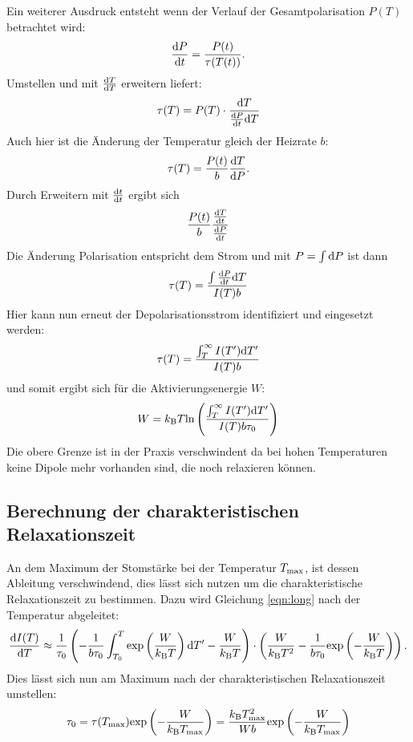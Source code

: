 				Ein weiterer Ausdruck entsteht wenn der Verlauf der Gesamtpolarisation $P(T)$ betrachtet wird:
				\begin{equation}
					\frac{\text{d} P}{\text{d} t} = \frac{P(t)}{\tau(T(t))}.
				\end{equation}
				Umstellen und mit $\frac{\text{d} T}{\text{d} T}$ erweitern liefert:
				\begin{equation}
					\tau(T) = P(T) \cdot \frac{\text{d}T}{\frac{\text{d} P}{\text{d} t}\text{d}T}
				\end{equation}
				Auch hier ist die Änderung der Temperatur gleich der Heizrate $b$:
				\begin{equation}
					\tau(T) = \frac{P(t)}{b}\frac{\text{d} T}{\text{d} P}.
				\end{equation}
				Durch Erweitern mit $\frac{\text{d} t}{\text{d} t}$ ergibt sich
				\begin{equation}
					\frac{P(t)}{b} \frac{\frac{\text{d} T}{\text{d} t}}{\frac{\text{d} P}{\text{d} t}}
				\end{equation}
				Die Änderung Polarisation entspricht dem Strom und mit $P = \int \text{d}P$ ist dann
				\begin{equation}
					\tau(T) = \frac{\int \frac{\text{d} P}{\text{d} t}\text{d}T}{I(T)b}
				\end{equation}
				Hier kann nun erneut der Depolarisationsstrom identifiziert und eingesetzt werden:
				\begin{equation}
					\tau(T) = \frac{\int_T^\infty I(T')\text{d}T'}{I(T)b}
				\end{equation}
				und somit ergibt sich für die Aktivierungsenergie $W$:
				\begin{equation}
					W = k_{\text{B}}T\text{ln}\left( \frac{\int_T^\infty I(T')\text{d}T'}{I(T)b\tau_0}\right)
					\label{eqn:int}
				\end{equation}
				Die obere Grenze ist in der Praxis verschwindent da bei hohen Temperaturen keine Dipole mehr vorhanden sind, die noch relaxieren können.

	\subsection{Berechnung der charakteristischen Relaxationszeit}
				
		An dem Maximum der Stomstärke bei der Temperatur $T_{\text{max}}$, ist dessen Ableitung verschwindend, dies lässt sich nutzen um die charakteristische Relaxationszeit zu bestimmen.
		Dazu wird Gleichung \ref{eqn:long} nach der Temperatur abgeleitet:
		\begin{equation}
			\frac{\text{d} I(T)}{\text{d} T} \approx \frac{1}{\tau_0} \left( - \frac{1}{b\tau_0}
			\int_{T_0}^T \text{exp}\left(\frac{W}{k_{\text{B}}T}\right)\text{d}T' - 
			\frac{W}{k_{\text{B}}T}\right) \cdot \left( \frac{W}{k_{\text{B}}T^2} - 
			\frac{1}{b\tau_0} 
			\text{exp}\left(-\frac{W}{k_{\text{B}}T}\right)\right).
		\end{equation}
		Dies lässt sich nun am Maximum nach der charakteristischen Relaxationszeit umstellen:
		\begin{equation}
			\tau_0 = \tau(T_{\text{max}})\text{exp}\left(- \frac{W}{k_{\text{B}}T_{\text{max}}}\right) = \frac{k_{\text{B}}T^2_{\text{max}}}{Wb}\text{exp}\left(-\frac{W}{k_{\text{B}}T_{\text{max}}}\right)
			\label{eqn:taumaxsource}
		\end{equation}

	
